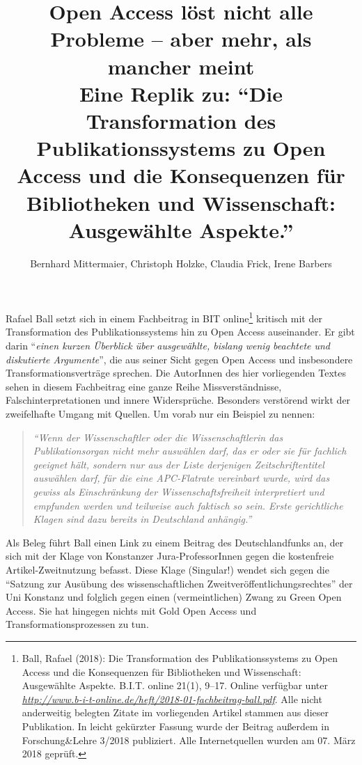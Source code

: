 \documentclass[a4paper,
fontsize=11pt,
oneside,
numbers=noperiodatend,
parskip=half-,
bibliography=totoc,
final
]{scrartcl}
\title{\LARGE{Open Access löst nicht alle Probleme – aber mehr, als mancher meint\\
Eine Replik zu: \enquote{Die Transformation des Publikationssystems zu Open Access und die Konsequenzen für Bibliotheken und Wissenschaft: Ausgewählte Aspekte.}}} %
\author{Bernhard Mittermaier, Christoph Holzke, Claudia Frick, Irene Barbers} %
\date{}
\begin{document}
\maketitle
\thispagestyle{fancyplain} 


Rafael Ball setzt sich in einem Fachbeitrag in BIT online\footnote{Ball,
  Rafael (2018): Die Transformation des Publikationssystems zu Open
  Access und die Konsequenzen für Bibliotheken und Wissenschaft:
  Ausgewählte Aspekte. B.I.T. online 21(1), 9--17. Online verfügbar
  unter
  \href{http://www.b-i-t-online.de/heft/2018-01-fachbeitrag-ball.pdf}{\emph{http://www.b-i-t-online.de/heft/2018-01-fachbeitrag-ball.pdf}}.
  Alle nicht anderweitig belegten Zitate im vorliegenden Artikel stammen
  aus dieser Publikation. In leicht gekürzter Fassung wurde der Beitrag
  außerdem in Forschung\&Lehre 3/2018 publiziert. Alle Internetquellen
  wurden am 07. März 2018 geprüft.} kritisch mit der Transformation des
Publikationssystems hin zu Open Access auseinander. Er gibt darin
\enquote{\emph{einen kurzen Überblick über ausgewählte, bislang wenig
beachtete und diskutierte Argumente}}, die aus seiner Sicht gegen Open
Access und insbesondere Transformationsverträge sprechen. Die AutorInnen
des hier vorliegenden Textes sehen in diesem Fachbeitrag eine ganze
Reihe Missverständnisse, Falschinterpretationen und innere Widersprüche.
Besonders verstörend wirkt der zweifelhafte Umgang mit Quellen. Um vorab
nur ein Beispiel zu nennen:

\begin{quote}
\emph{\enquote{Wenn der Wissenschaftler oder die Wissenschaftlerin das
Publikationsorgan nicht mehr auswählen darf, das er oder sie für
fachlich geeignet hält, sondern nur aus der Liste derjenigen
Zeitschriftentitel auswählen darf, für die eine APC-Flatrate vereinbart
wurde, wird das gewiss als Einschränkung der Wissenschaftsfreiheit
interpretiert und empfunden werden und teilweise auch faktisch so sein.
Erste gerichtliche Klagen sind dazu bereits in Deutschland anhängig.}}
\end{quote}

Als Beleg führt Ball einen Link zu einem Beitrag des Deutschlandfunks
an, der sich mit der Klage von Konstanzer Jura-ProfessorInnen gegen die
kostenfreie Artikel-Zweitnutzung befasst. Diese Klage (Singular!) wendet
sich gegen die \enquote{Satzung zur Ausübung des wissenschaftlichen
Zweitveröffentlichungsrechtes} der Uni Konstanz und folglich gegen einen
(vermeintlichen) Zwang zu Green Open Access. Sie hat hingegen nichts mit
Gold Open Access und Transformationsprozessen zu tun.
\end{document}
